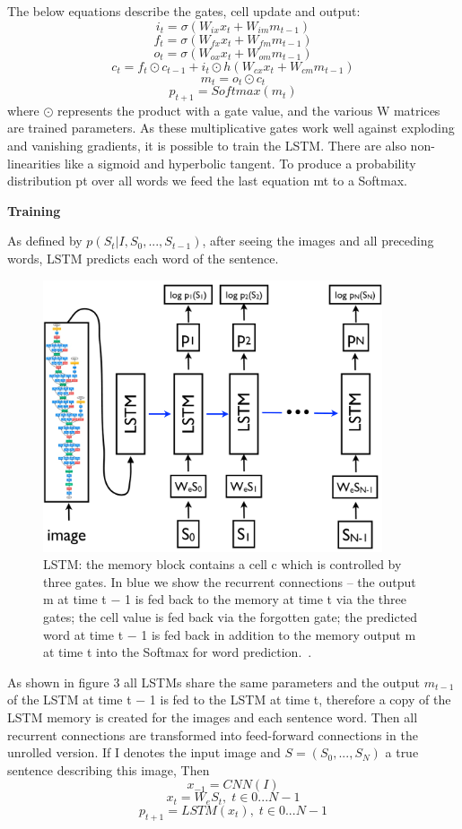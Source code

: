 \documentclass[a4paper,UKenglish,cleveref, autoref, thm-restate]{lipics-v2021}
\begin{document}
The below equations describe the gates, cell update and output:
\[ i_{t} = \sigma (W_{ix}x_{t} + W_{im}m_{t−1})  \label{eq:equation4} \tag{4} \]
\[ f_{t} = \sigma (W_{fx}x_{t} + W_{fm}m_{t−1})  \label{eq:equation5} \tag{5} \]
\[ o_{t} = \sigma (W_{ox}x_{t} + W_{om}m_{t−1})   \label{eq:equation6} \tag{6} \]
\[ c_{t} = f_{t} \odot c_{t-1} + i_{t} \odot h(W_{cx}x_{t} + W_{cm}m_{t-1}) \label{eq:equation7} \tag{7} \]
\[m_{t} = o_{t} \odot c_{t} \label{eq:equation8} \tag{8}\]
\[p_{t+1} = Softmax(m_t)  \label{eq:equation9} \tag{9} \]
where $ \odot$ represents the product with a gate value, and the various W matrices are trained parameters.
As these multiplicative gates work well against exploding and vanishing gradients, it is possible to train the LSTM.
There are also non-linearities like a sigmoid and hyperbolic tangent.
To produce a probability distribution pt over all words we feed the last equation mt to a Softmax.

\textbf{Training}

As defined by $p(S_{t}|I,S_{0},...,S_{t-1})$, after seeing the images and all preceding words, LSTM predicts each word of the sentence.
\begin{figure}[ht]
    \centering
    \includegraphics[width=10cm]{images/lstm.png}
    \caption{ LSTM: the memory block contains a cell c which is
controlled by three gates. In blue we show the recurrent connections – the output m at time t − 1 is fed back to the memory at
time t via the three gates; the cell value is fed back via the forgotten
gate; the predicted word at time t − 1 is fed back in addition to the
memory output m at time t into the Softmax for word prediction.~\cite{}.}
    \label{fig:}
\end{figure}
As shown in figure 3 all LSTMs share the same parameters and the output $m_{t−1}$ of the LSTM at time t − 1 is fed to the LSTM at time t, therefore a copy of the LSTM memory is created for the images and each sentence word. Then all recurrent connections are transformed into feed-forward connections in the unrolled version.
If I denotes the input image and $S = (S_{0}, . . . , S_{N} )$ a true sentence describing this image,
Then
\[ x_{-1} = CNN(I) \label{eq:equation10} \tag{10} \]
\[ x_{t} = W_{e}S_{t},\; t \in {0 . . . N − 1} \label{eq:equation11} \tag{11} \]
\[ p_{t+1} = LSTM(x_{t}),\; t \in {0 . . . N − 1} \label{eq:equation12} \tag{12} \]
\end{document}

